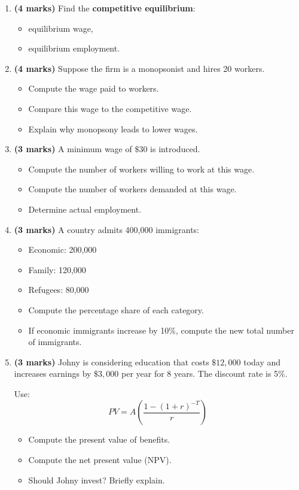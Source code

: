 \documentclass[12pt]{article}
\begin{document}
\begin{enumerate}[label=(\alph*)]

\item \textbf{(4 marks)}  
Find the \textbf{competitive equilibrium}:
\begin{itemize}
    \item equilibrium wage,
    \item equilibrium employment.
\end{itemize}

\item \textbf{(4 marks)}  
Suppose the firm is a monopsonist and hires 20 workers.

\begin{itemize}
    \item Compute the wage paid to workers.
    \item Compare this wage to the competitive wage.
    \item Explain why monopsony leads to lower wages.
\end{itemize}

\item \textbf{(3 marks)}  
A minimum wage of \(\$30\) is introduced.

\begin{itemize}
    \item Compute the number of workers willing to work at this wage.
    \item Compute the number of workers demanded at this wage.
    \item Determine actual employment.
\end{itemize}

\item \textbf{(3 marks)}  
A country admits 400,000 immigrants:
\begin{itemize}
    \item Economic: 200,000
    \item Family: 120,000
    \item Refugees: 80,000
\end{itemize}

\begin{itemize}
    \item Compute the percentage share of each category.
    \item If economic immigrants increase by 10\%, compute the new total number of immigrants.
\end{itemize}

\item \textbf{(3 marks)}  
Johny is considering education that costs \(\$12{,}000\) today and increases earnings by \(\$3{,}000\) per year for 8 years. The discount rate is 5\%.

Use:
\[
PV = A\left(\frac{1-(1+r)^{-T}}{r}\right)
\]

\begin{itemize}
    \item Compute the present value of benefits.
    \item Compute the net present value (NPV).
    \item Should Johny invest? Briefly explain.
\end{itemize}

\end{enumerate}
\end{document}
